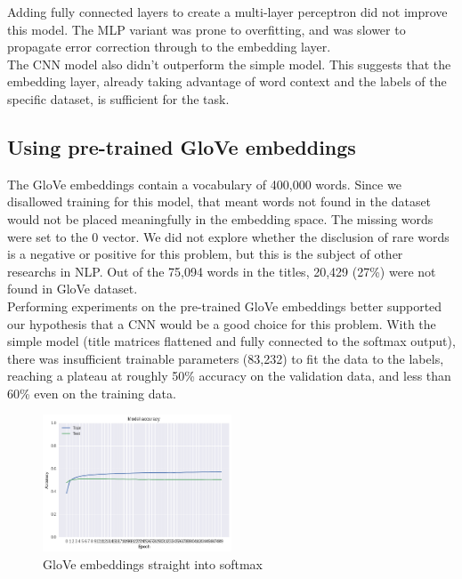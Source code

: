 \documentclass[jou,apacite, 10px]{apa6}
\begin{document}
Adding fully connected layers to create a multi-layer perceptron did not improve this model. The MLP variant was prone to overfitting, and was slower to propagate error correction through to the embedding layer.\\

The CNN model also didn't outperform the simple model. This suggests that the embedding layer, already taking advantage of word context and the labels of the specific dataset, is sufficient for the task.

\subsection{Using pre-trained GloVe embeddings}
The GloVe embeddings contain a vocabulary of 400,000 words. Since we disallowed training for this model, that meant words not found in the dataset would not be placed meaningfully in the embedding space. The missing words were set to the 0 vector. We did not explore whether the disclusion of rare words is a negative or positive for this problem, but this is the subject of other researchs in NLP. Out of the 75,094 words in the titles, 20,429 (27\%) were not found in GloVe dataset.\\

Performing experiments on the pre-trained GloVe embeddings better supported our hypothesis that a CNN would be a good choice for this problem. With the simple model (title matrices flattened and fully connected to the softmax output), there was insufficient trainable parameters (83,232) to fit the data to the labels, reaching a plateau at roughly 50\% accuracy on the validation data, and less than 60\% even on the training data.\\

\begin{figure}[h!]
\captionsetup{justification=centering}
    \centering
     \includegraphics[width=0.5\textwidth]{images/Training-Glove}
        \caption{GloVe embeddings straight into softmax}
\end{figure}
\end{document}
